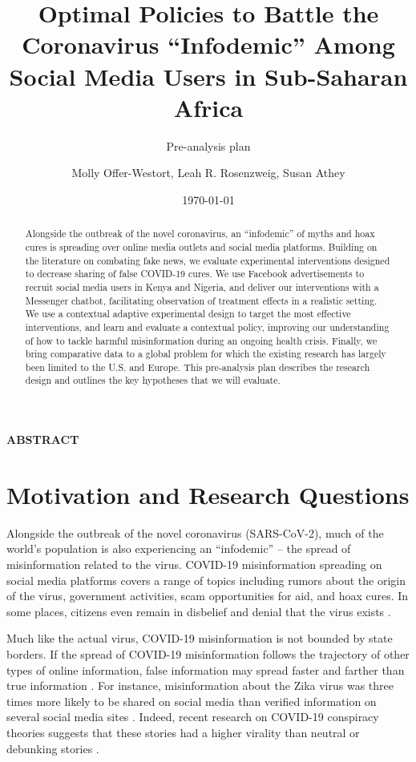 \documentclass[letterpaper, 12pt, parskip=full,]{scrartcl}
\title{Optimal Policies to Battle the Coronavirus ``Infodemic'' Among Social Media Users in Sub-Saharan Africa}
\subtitle{Pre-analysis plan}
\author{Molly Offer-Westort, Leah R. Rosenzweig, Susan Athey}
\date{\today}
\begin{document}
%
\normalsize%
\maketitle%
\tableofcontents%
\clearpage%


\centerline{\textbf{ABSTRACT}}
\begin{abstract}
Alongside the outbreak of the novel coronavirus, an “infodemic” of myths and hoax cures is spreading over online media outlets and social media platforms. Building on the literature on combating fake news, we evaluate experimental interventions designed to decrease sharing of false COVID-19 cures. We use Facebook advertisements to recruit social media users in Kenya and Nigeria, and deliver our interventions with a Messenger chatbot, facilitating observation of treatment effects in a realistic setting. We use a contextual adaptive experimental design to target the most effective interventions, and learn and evaluate a contextual policy, improving our understanding of how to tackle harmful misinformation during an ongoing health crisis. Finally, we bring comparative data to a global problem for which the existing research has largely been limited to the U.S. and Europe. This pre-analysis plan describes the research design and outlines the key hypotheses that we will evaluate.
\end{abstract}





\section{Motivation and Research Questions}

Alongside the outbreak of the novel coronavirus (SARS-CoV-2), much of the world's population is also experiencing an ``infodemic'' -- the spread of misinformation related to the virus. COVID-19 misinformation spreading on social media platforms covers a range of topics including rumors about the origin of the virus, government activities, scam opportunities for aid, and hoax cures. In some places, citizens even remain in disbelief and denial that the virus exists \citep{mwaura2019why-some}. 

Much like the actual virus, COVID-19 misinformation is not bounded by state borders. If the spread of COVID-19 misinformation follows the trajectory of other types of online information, false information may spread faster and farther than true information \citep{vosoughi2018spread}. For instance, misinformation about the Zika virus was three times more likely to be shared on social media than verified information on several social media sites \citep{sharma2017zika}. Indeed, recent research on COVID-19 conspiracy theories suggests that these stories had a higher virality than neutral or debunking stories \citep{HKS_whatsapp}. %
 
\end{document}
